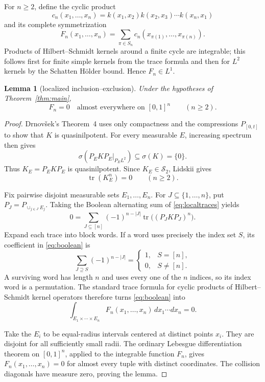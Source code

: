 \documentclass[11pt]{article}
\newtheorem{lemma}[theorem]{Lemma}
\newcommand{\Stwo}{\mathcal S_2}
\newcommand{\tr}{\operatorname{tr}}
\begin{document}
For $n\geq2$, define the cyclic product
\[
 c_n(x_1,\ldots,x_n)=
 k(x_1,x_2)k(x_2,x_3)\cdots k(x_n,x_1)
\]
and its complete symmetrization
\[
 F_n(x_1,\ldots,x_n)=
 \sum_{\pi\in S_n}c_n(x_{\pi(1)},\ldots,x_{\pi(n)}).
\]
Products of Hilbert--Schmidt kernels around a finite cycle are integrable;
this follows first for finite simple kernels from the trace formula and then
for $L^2$ kernels by the Schatten H\"older bound.  Hence $F_n\in L^1$.

\begin{lemma}[localized inclusion--exclusion]\label{lem:sym}
Under the hypotheses of Theorem~\ref{thm:main},
\[
 F_n=0\quad\text{almost everywhere on }[0,1]^n
 \qquad(n\geq2).
\]
\end{lemma}

\begin{proof}
Drnov\v sek's Theorem~4 \cite{Drnovsek} uses only compactness and the
compressions $P_{[0,t]}$ to show that $K$ is quasinilpotent.  For every
measurable $E$, increasing spectrum then gives
\[
 \sigma(P_EKP_E|_{P_EL^2})\subseteq\sigma(K)=\{0\}.
\]
Thus $K_E=P_EKP_E$ is quasinilpotent.  Since $K_E\in\Stwo$, Lidskii gives
\begin{equation}\label{eq:localtraces}
 \tr(K_E^n)=0\qquad(n\geq2).
\end{equation}

Fix pairwise disjoint measurable sets $E_1,\ldots,E_n$.  For
$J\subseteq\{1,\ldots,n\}$, put $P_J=P_{\cup_{j\in J}E_j}$.  Taking the
Boolean alternating sum of \eqref{eq:localtraces} yields
\begin{equation}\label{eq:boolean}
 0=\sum_{J\subseteq[n]}(-1)^{n-|J|}
       \tr\bigl((P_JKP_J)^n\bigr).
\end{equation}
Expand each trace into block words.  If a word uses precisely the index set
$S$, its coefficient in \eqref{eq:boolean} is
\[
 \sum_{J\supseteq S}(-1)^{n-|J|}
 =\begin{cases}1,&S=[n],\\0,&S\ne[n].\end{cases}
\]
A surviving word has length $n$ and uses every one of the $n$ indices, so
its index word is a permutation.  The standard trace formula for cyclic
products of Hilbert--Schmidt kernel operators therefore turns
\eqref{eq:boolean} into
\[
 \int_{E_1\times\cdots\times E_n}F_n(x_1,\ldots,x_n)
 \,dx_1\cdots dx_n=0.
\]

Take the $E_i$ to be equal-radius intervals centered at distinct points
$x_i$.  They are disjoint for all sufficiently small radii.  The ordinary
Lebesgue differentiation theorem on $[0,1]^n$, applied to the integrable
function $F_n$, gives $F_n(x_1,\ldots,x_n)=0$ for almost every tuple with
distinct coordinates.  The collision diagonals have measure zero, proving
the lemma.
\end{proof}
\end{document}
